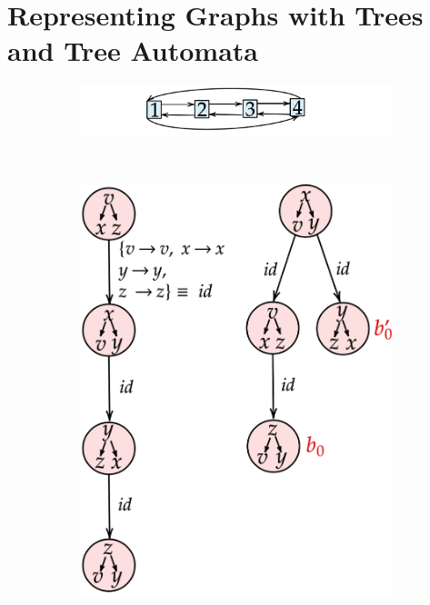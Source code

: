 {\section{Representing Graphs with Trees and Tree Automata}
\begin{figure}[t]
\begin{center}
                \begin{subfigure}[b]{0.46\linewidth}
                  \includegraphics[scale=0.15]{figs/netys/dll.png}\\
                \end{subfigure}\\
		\begin{subfigure}[b]{0.32\linewidth}
		  \includegraphics[scale=0.15]{figs/netys/decomp1.png}

\end{subfigure}
\end{center}
\end{figure}}
